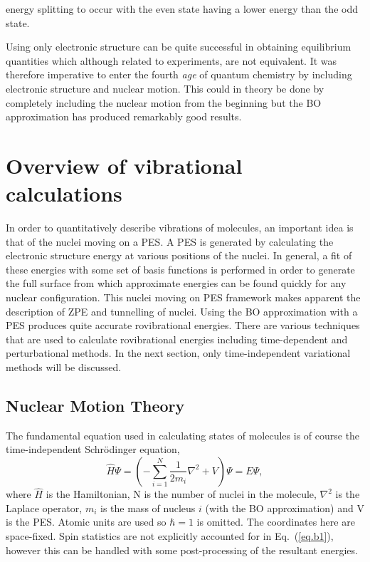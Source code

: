 energy splitting to occur with the even state having a lower energy than the odd state.     



Using only electronic structure can be quite successful in obtaining equilibrium quantities which although related to experiments, are not equivalent.  It was therefore imperative to enter the fourth \emph{age} of quantum chemistry by including electronic structure and nuclear motion\cite{Csaszar2012}.  This could in theory be done by completely including the nuclear motion from the beginning but the BO approximation has produced remarkably good results.

\section{Overview of vibrational calculations}
In order to quantitatively describe vibrations of molecules, an important idea is that of the nuclei moving on a PES.  A PES is generated by calculating the electronic structure energy at various positions of the nuclei.  In general, a fit of these energies with some set of basis functions is performed in order to generate the full surface from which approximate energies can be found quickly for any nuclear configuration\cite{Murrell1984}.  This nuclei moving on PES framework makes apparent the description of ZPE and tunnelling of nuclei.  Using the BO approximation with a PES produces quite accurate rovibrational energies.  There are various techniques that are used to calculate rovibrational energies including time-dependent and perturbational methods.  In the next section, only time-independent variational methods will be discussed. 

\subsection{Nuclear Motion Theory}
The fundamental equation used in calculating states of molecules is of course the time-independent Schr\"odinger equation,
\begin{equation}\label{eq.b1}
\hat{H}\Psi = \left(-\sum_{i=1}^N \dfrac{1}{2m_i}\nabla^2 +V\right)\Psi=E\Psi,
\end{equation}
where $\hat{H}$ is the Hamiltonian, N is the number of nuclei in the molecule, $\nabla^2$ is the Laplace operator, $m_i$ is the mass of nucleus $i$ (with the BO approximation) and V is the PES.  Atomic units are used so $\hbar=1$ is omitted. The coordinates here are space-fixed. Spin statistics are not explicitly accounted for in Eq.~(\ref{eq.b1}), however this can be handled with some post-processing of the resultant energies. 

